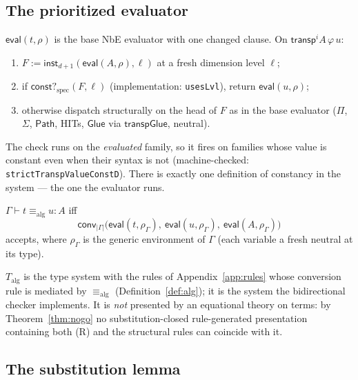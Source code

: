 \documentclass{lmcs}
\newcommand{\transp}{\mathsf{transp}}
\newcommand{\Glue}{\mathsf{Glue}}
\newcommand{\aconv}{\equiv_{\mathrm{alg}}}
\newcommand{\Path}{\mathsf{Path}}
\newcommand{\evalop}{\mathsf{eval}}
\newcommand{\constspec}{\mathsf{const?}_{\mathrm{spec}}}
\newcommand{\convop}{\mathsf{conv}}
\newcommand{\capp}{\mathsf{inst}}
\begin{document}
\subsection{The prioritized evaluator}

$\evalop(t, \rho)$ is the base NbE evaluator with one changed clause.
On $\transp^i A\,\varphi\,u$:
\begin{enumerate}
\item $F := \capp_{d+1}(\evalop(A, \rho), \ell)$ at a fresh dimension
  level $\ell$;
\item if $\constspec(F, \ell)$ (implementation: \texttt{usesLvl}),
  return $\evalop(u, \rho)$;
\item otherwise dispatch structurally on the head of $F$ as in the
  base evaluator ($\Pi$, $\Sigma$, $\Path$, HITs, $\Glue$ via
  $\mathsf{transpGlue}$, neutral).
\end{enumerate}
The check runs on the \emph{evaluated} family, so it fires on
families whose value is constant even when their syntax is not
(machine-checked: \texttt{strictTranspValueConstD}).  There is
exactly one definition of constancy in the system --- the one the
evaluator runs.

\begin{defi}\label{def:alg}
  $\Gamma \vdash t \aconv u : A$ iff
  \[
    \convop_{|\Gamma|}\bigl(\evalop(t, \rho_\Gamma),\
    \evalop(u, \rho_\Gamma),\ \evalop(A, \rho_\Gamma)\bigr)
  \]
  accepts, where
  $\rho_\Gamma$ is the generic environment of $\Gamma$ (each variable
  a fresh neutral at its type).
\end{defi}

\begin{defi}\label{def:talg}
  $T_{\mathrm{alg}}$ is the type system with the rules of
  Appendix~\ref{app:rules} whose conversion rule is mediated by
  $\aconv$ (Definition~\ref{def:alg}); it is the system the
  bidirectional checker implements.  It is \emph{not} presented by an
  equational theory on terms: by Theorem~\ref{thm:nogo} no
  substitution-closed rule-generated presentation containing both
  (R) and the structural rules can coincide with it.
\end{defi}

\subsection{The substitution lemma}
\end{document}
